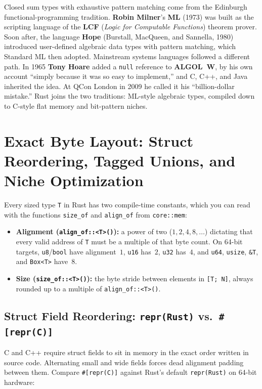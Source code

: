 \begin{historybox}
Closed sum types with exhaustive pattern matching come from the Edinburgh functional-programming tradition. \textbf{Robin Milner}'s \textbf{ML} (1973) was built as the scripting language of the \textbf{LCF} (\emph{Logic for Computable Functions}) theorem prover. Soon after, the language \textbf{Hope} (Burstall, MacQueen, and Sannella, 1980) introduced user-defined algebraic data types with pattern matching, which Standard ML then adopted. Mainstream systems languages followed a different path. In 1965 \textbf{Tony Hoare} added a \texttt{null} reference to \textbf{ALGOL~W}, by his own account ``simply because it was so easy to implement,'' and C, C++, and Java inherited the idea. At QCon London in 2009 he called it his ``billion-dollar mistake.'' Rust joins the two traditions: ML-style algebraic types, compiled down to C-style flat memory and bit-pattern niches.
\end{historybox}

\section{Exact Byte Layout: Struct Reordering, Tagged Unions, and Niche Optimization}
\label{ch05:memory-layout}

Every sized type \texttt{T} in Rust has two compile-time constants, which you can read with the functions \texttt{size\_of} and \texttt{align\_of} from \texttt{core::mem}:
\begin{itemize}
  \item \textbf{Alignment (\texttt{align\_of::<T>()}):} a power of two ($1, 2, 4, 8, \dots$) dictating that every valid address of \texttt{T} must be a multiple of that byte count. On 64-bit targets, \texttt{u8}/\texttt{bool} have alignment~$1$, \texttt{u16} has~$2$, \texttt{u32} has~$4$, and \texttt{u64}, \texttt{usize}, \texttt{\&T}, and \texttt{Box<T>} have~$8$.
  \item \textbf{Size (\texttt{size\_of::<T>()}):} the byte stride between elements in \texttt{[T; N]}, always rounded up to a multiple of \texttt{align\_of::<T>()}.
\end{itemize}

\subsection{Struct Field Reordering: \texttt{repr(Rust)} vs.\ \texttt{\#[repr(C)]}}
\label{ch05:struct-reordering}

C and C++ require struct fields to sit in memory in the exact order written in source code. Alternating small and wide fields forces dead alignment padding between them. Compare \texttt{\#[repr(C)]} against Rust's default \texttt{repr(Rust)} on 64-bit hardware:

